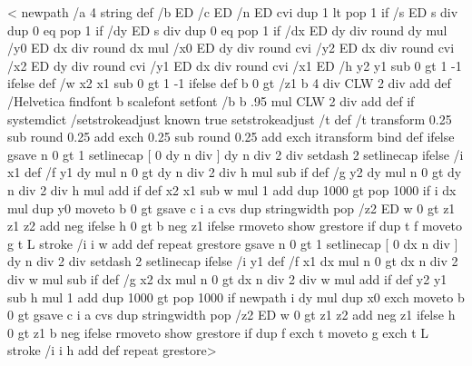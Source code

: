 <%
  newpath
  /a 4 string def            %
  /b ED                      %
  /c ED                      %
  /n ED                      %
  cvi dup 1 lt { pop 1 } if /s ED   %
  s div dup 0 eq { pop 1 } if /dy ED  %
  s div dup 0 eq { pop 1 } if /dx ED  %
  dy div round dy mul /y0 ED     %
  dx div round dx mul /x0 ED     %
  dy div round cvi /y2 ED     %
  dx div round cvi /x2 ED     %
  dy div round cvi /y1 ED     %
  dx div round cvi /x1 ED     %
  /h y2 y1 sub 0 gt { 1 } { -1 } ifelse def  %
  /w x2 x1 sub 0 gt { 1 } { -1 } ifelse def  %
  b 0 gt
  { /z1 b 4 div CLW 2 div add def
    /Helvetica findfont b scalefont setfont
    /b b .95 mul CLW 2 div add def }
  if
  systemdict /setstrokeadjust known  %
  { true setstrokeadjust /t { } def }
  { /t {
      transform
      0.25 sub round 0.25 add exch
      0.25 sub round 0.25 add exch
      itransform
    } bind def }
  ifelse
  gsave
    n 0 gt
    { 1 setlinecap [ 0 dy n div ] dy n div 2 div setdash }
    { 2 setlinecap }
    ifelse
    /i x1 def
    /f y1 dy mul n 0 gt { dy n div 2 div h mul sub } if def
    /g y2 dy mul n 0 gt { dy n div 2 div h mul add } if def
    x2 x1 sub w mul 1 add dup 1000 gt { pop 1000 } if
    {
      i dx mul dup y0 moveto
      b 0 gt
      { gsave
          c                       %
          i a cvs dup             %
          stringwidth pop /z2 ED  %
          w 0 gt {z1} {z1 z2 add neg} ifelse
          h 0 gt {b neg} {z1} ifelse
          rmoveto
          show
        grestore
      } if
      dup t f moveto g t L stroke
      /i i w add def
    } repeat
  grestore
  gsave
    n 0 gt
    { 1 setlinecap [ 0 dx n div ] dy n div 2 div setdash }
    { 2 setlinecap }
    ifelse
    /i y1 def
    /f x1 dx mul n 0 gt { dx n div 2 div w mul sub } if def
    /g x2 dx mul n 0 gt { dx n div 2 div w mul add } if def
    y2 y1 sub h mul 1 add dup 1000 gt { pop 1000 } if
    { newpath
      i dy mul dup x0 exch moveto
      b 0 gt
      { gsave
          c
          i a cvs dup
          stringwidth pop /z2 ED
          w 0 gt {z1 z2 add neg} {z1} ifelse
          h 0 gt {z1} {b neg} ifelse
          rmoveto
          show
        grestore
      } if
      dup f exch t moveto g exch t L stroke
      /i i h add def
    } repeat
  grestore>

